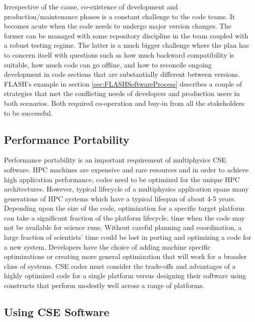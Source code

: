 Irrespective of the cause, co-existence of development and
production/maintenance phases is a constant challenge to the code
teams. It becomes acute when the code needs to undergo major version
changes. The former can be managed with some repository
discipline in the team coupled with a robust testing regime. The latter
is a much bigger challenge where the plan has to concern itself with
questions such as how much backward compatibility is suitable, how
much code can go offline, and how to reconcile ongoing development in
code sections that are substantially different between versions.
FLASH's example in section \ref{sec:FLASHSoftwareProcess} describes
a couple of strategies that met the conflicting needs of developers and
production users in both scenarios. Both required co-operation and
buy-in from all the stakeholders to be successful. 


\subsection{Performance Portability}
\label{sec:perfport}

Performance portability is an important requirement of multiphysics
CSE software. HPC machines are expensive and rare resources and in
order to achieve high application performance, codes need to be
optimized for the unique HPC architectures. However, typical lifecycle of a
multiphysics application spans many generations of HPC systems which have a typical lifespan of about 4-5 years.  Depending upon the size of the
code, optimization for a specific target platform can take a
significant fraction of the platform lifecycle, time when the code may not be available for science runs.  Without careful planning and coordination,  a
large fraction of scientists' time could be lost in porting and optimizing
a code for a new system.  Developers have the choice of adding machine
specific optimizations or creating more general optimization that will
work for a broader class of systems.  CSE codes must consider the
trade-offs and advantages of a highly optimized code for a single
platform versus designing their software using constructs that perform
modestly well across a range of platforms. 



\subsection{Using CSE Software}


